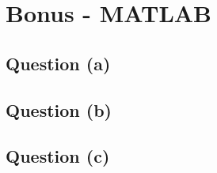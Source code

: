 \section{Bonus - MATLAB}
	\subsection{Question (a)}
	\subsection{Question (b)}
	\subsection{Question (c)}
